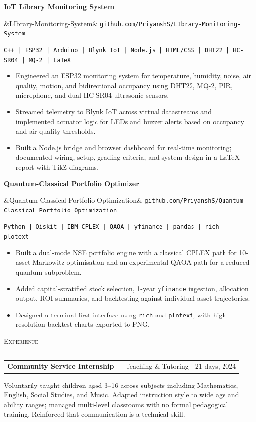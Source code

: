 \documentclass[10pt, a4paper]{article}
\newcommand{\rsection}[1]{%
  \vspace{7pt}%
  {\small\scshape\color{muted}#1}%
  \vspace{2pt}\par\noindent%
  {\color{ruled}\rule{\linewidth}{0.4pt}}\par%
  \vspace{2pt}%
}
\newcommand{\rproject}[4]{%
  \noindent\textbf{#1}\par%
  \ifx&#2&\else
    \vspace{-1pt}%
    {\footnotesize\texttt{github.com/PriyanshS/#2}}\par%
  \fi
  \vspace{-1pt}%
  {\small\texttt{#3}}\par%
  \vspace{1pt}%
  #4%
  \vspace{3pt}%
  \noindent{\color{ruled}\rule{\linewidth}{0.3pt}}\par%
  \vspace{4pt}%
}
\begin{document}
\rproject{IoT Library Monitoring System}
  {LIbrary-Monitoring-System}
  {C++ | ESP32 | Arduino | Blynk IoT | Node.js | HTML/CSS | DHT22 | HC-SR04 | MQ-2 | LaTeX}
  {\begin{itemize}
    \item Engineered an ESP32 monitoring system for temperature, humidity,
      noise, air quality, motion, and bidirectional occupancy using DHT22,
      MQ-2, PIR, microphone, and dual HC-SR04 ultrasonic sensors.
    \item Streamed telemetry to Blynk IoT across virtual datastreams and
      implemented actuator logic for LEDs and buzzer alerts based on occupancy
      and air-quality thresholds.
    \item Built a Node.js bridge and browser dashboard for real-time monitoring;
      documented wiring, setup, grading criteria, and system design in a
      \LaTeX{} report with TikZ diagrams.
  \end{itemize}}


\rproject{Quantum-Classical Portfolio Optimizer}
  {Quantum-Classical-Portfolio-Optimization}
  {Python | Qiskit | IBM CPLEX | QAOA | yfinance | pandas | rich | plotext}
  {\begin{itemize}
    \item Built a dual-mode NSE portfolio engine with a classical CPLEX path
      for 10-asset Markowitz optimisation and an experimental QAOA path for
      a reduced quantum subproblem.
    \item Added capital-stratified stock selection, 1-year \texttt{yfinance}
      ingestion, allocation output, ROI summaries, and backtesting against
      individual asset trajectories.
    \item Designed a terminal-first interface using \texttt{rich} and
      \texttt{plotext}, with high-resolution backtest charts exported to PNG.
  \end{itemize}}

\rsection{Experience}

\noindent
\begin{tabularx}{\linewidth}{@{}X r@{}}
  \textbf{Community Service Internship} --- Teaching \& Tutoring
  & {\small\color{muted}21 days, 2024} \\
\end{tabularx}
{\footnotesize\color{muted}
  Voluntarily taught children aged 3--16 across subjects including
  Mathematics, English, Social Studies, and Music.
  Adapted instruction style to wide age and ability ranges;
  managed multi-level classrooms with no formal pedagogical training.
  Reinforced that communication is a technical skill.
}
\end{document}
